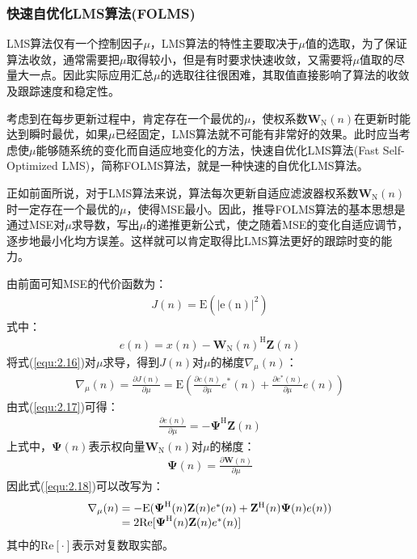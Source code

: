 \subsubsection*{快速自优化LMS算法(FOLMS)}
LMS算法仅有一个控制因子$\mu$，LMS算法的特性主要取决于$\mu$值的选取，为了保证算法收敛，通常需要把$\mu$取得较小，但是有时要求快速收敛，又需要将$\mu$值取的尽量大一点。因此实际应用汇总$\mu$的选取往往很困难，其取值直接影响了算法的收敛及跟踪速度和稳定性。

考虑到在每步更新过程中，肯定存在一个最优的$\mu$，使权系数$\mathbf{W}_{\mathrm{N}}(n)$在更新时能达到瞬时最优，如果$\mu$已经固定，LMS算法就不可能有非常好的效果。此时应当考虑使$\mu$能够随系统的变化而自适应地变化的方法，快速自优化LMS算法(Fast
Self-Optimized
LMS)，简称FOLMS算法，就是一种快速的自优化LMS算法\citep{Bragard1990,George1999,Benveniste1990}。

正如前面所说，对于LMS算法来说，算法每次更新自适应滤波器权系数$\mathbf{W}_{\mathrm{N}}(n)$时一定存在一个最优的$\mu$，使得MSE最小。因此，推导FOLMS算法的基本思想是通过MSE对$\mu$求导数，写出$\mu$的递推更新公式，使之随着MSE的变化自适应调节，逐步地最小化均方误差。这样就可以肯定取得比LMS算法更好的跟踪时变的能力。

由前面可知MSE的代价函数为：
\begin{eqnarray}
    J(n)=\mathrm{E(|e(n)|^2)}
    \label{equ:2.16}
\end{eqnarray}
式中：
\begin{eqnarray}
    e(n)=x(n)-\mathbf{W}_{\mathrm{N}}(n)^{\mathrm{H}}\mathbf{Z}(n)
    \label{equ:2.17}
\end{eqnarray}
将式(\ref{equ:2.16})对$\mu$求导，得到$J(n)$对$\mu$的梯度$\nabla_{\mu}(n)$：
\begin{eqnarray}
    \nabla_{\mu}(n)=\frac{\partial J(n)}{\partial
    \mu}=\mathrm{E}\left(\frac{\partial e(n)}{\partial
    \mu}e^*(n)+\frac{\partial e^*(n)}{\partial \mu}e(n)\right)
    \label{equ:2.18}
\end{eqnarray}
由式(\ref{equ:2.17})可得：
\begin{eqnarray}
    \frac{\partial e(n)}{\partial \mu}=-\boldsymbol{\Psi}^{\mathrm{H}}\mathbf{Z}(n)
    \label{equ:2.19}
\end{eqnarray}
上式中，$\boldsymbol{\Psi}(n)$表示权向量$\mathbf{W}_{\mathrm{N}}(n)$对$\mu$的梯度：
\begin{eqnarray}
    \boldsymbol{\Psi}(n)=\frac{\partial\mathbf{W}(n)}{\partial\mu}
    \label{equ:2.20}
\end{eqnarray}
因此式(\ref{equ:2.18})可以改写为：
\begin{eqnarray}
    \begin{array}{l@{\;=\;}l}
        \nabla_{\mu}(n)&-\mathrm{E}(\boldsymbol{\Psi}^{\mathrm{H}}(n)\mathbf{Z}(n)e^*(n)+\mathbf{Z}^{\mathrm{H}}(n)\boldsymbol{\Psi}(n)e(n))\\
        &2\mathrm{Re}[\boldsymbol{\Psi}^{\mathrm{H}}(n)\mathbf{Z}(n)e^*(n)]
    \end{array}
    \label{equ:2.21}
\end{eqnarray}
其中的$\mathrm{Re}[\cdot]$表示对复数取实部。

